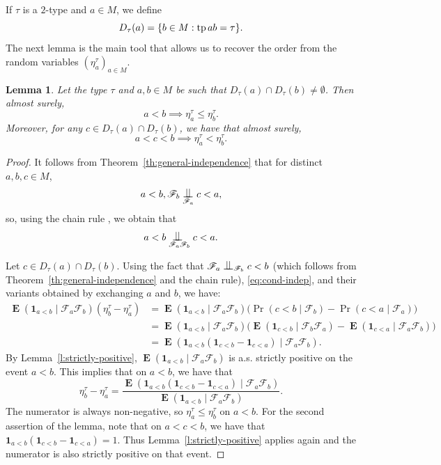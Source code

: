 \documentclass[JEP,XML,SOM,Unicode,published]{cedram}
\let\mathcal\mathscr
\theoremstyle{plain}
\newtheorem{lemma}[theorem]{Lemma}
\theoremstyle{definition}
\newcommand{\bOne}{{\mathbf 1}}
\newcommand{\cF}{\mathcal{F}}
\DeclareMathOperator{\E}{\mathbf{E}}
\DeclareMathOperator{\tp}{tp}
\DeclarePairedDelimiter\set{\{}{\}}
\newcommand{\indep}[1][]{%
  \mathrel{
    \mathop{
      \scalebox{1}[1.3]{\text{$\perp\!\!\!\perp$}}
    }\displaylimits_{#1}
  }
}
\begin{document}
If $\tau$ is a $2$-type and $a \in M$, we define
\begin{equation*}
D_\tau(a) = \set{b \in M : \tp ab = \tau}.
\end{equation*}
The next lemma is the main tool that allows us to recover the order from the random variables $(\eta^\tau_a)_{a \in M}$.
\begin{lemma}
\label{Lem:Inters}
Let the type $\tau$ and $a, b \in M$ be such that $D_\tau(a) \cap D_\tau(b) \neq \emptyset$. Then almost surely,
\begin{equation*}
a<b \implies \eta_a^\tau \leq \eta_b^\tau.
\end{equation*}
Moreover, for any $c \in D_\tau(a) \cap D_\tau(b)$, we have that almost surely,
\begin{equation*}
a < c < b \implies \eta^\tau_a < \eta^\tau_b.
\end{equation*}
\end{lemma}
\begin{proof}
It follows from Theorem~\ref{th:general-independence} that for distinct $a, b, c \in M$,
\begin{equation*}
a < b, \cF_b \indep[\cF_a] c < a,
\end{equation*}
so, using the chain rule \cite[Prop.\,5.8]{Kallenberg2002}, we obtain that
\begin{equation}
\label{eq:cond-indep}
a < b \indep[\cF_a \cF_b] c < a.
\end{equation}

Let $c \in D_\tau(a) \cap D_\tau(b)$. Using the fact that $\cF_a \indep[\cF_b] c < b$ (which follows from Theorem~\ref{th:general-independence} and the chain rule), \eqref{eq:cond-indep}, and their variants obtained by exchanging $a$ and $b$, we have:
\begin{equation*}
\begin{split}
\E(\bOne_{a < b} \mid \cF_a \cF_b) ( \eta^\tau_b - \eta^\tau_a ) &= \E(\bOne_{a < b} \mid \cF_a \cF_b) \big(\Pr(c < b \mid \cF_b) - \Pr(c < a \mid \cF_a) \big) \\
&= \E(\bOne_{a < b} \mid \cF_a \cF_b) \big(\E(\bOne_{c < b} \mid \cF_b \cF_a) - \E(\bOne_{c < a} \mid \cF_a \cF_b) \big) \\
&= \E(\bOne_{a < b}(\bOne_{c < b} - \bOne_{c < a}) \mid \cF_a \cF_b ).
\end{split}
\end{equation*}
By Lemma~\ref{l:strictly-positive}, $\E(\bOne_{a < b} \mid \cF_a \cF_b)$ is a.s. strictly positive on the event $a < b$. This implies that on $a < b$, we have that
\begin{equation*}
\eta^\tau_b - \eta^\tau_a = \frac{\E(\bOne_{a < b}(\bOne_{c < b} - \bOne_{c < a}) \mid \cF_a \cF_b )}{\E(\bOne_{a < b} \mid \cF_a \cF_b)}.
\end{equation*}
The numerator is always non-negative, so $\eta^\tau_a \leq \eta^\tau_b$ on $a < b$. For the second assertion of the lemma, note that on $a < c < b$, we have that $\bOne_{a < b}(\bOne_{c < b} - \bOne_{c < a}) = 1$. Thus Lemma~\ref{l:strictly-positive} applies again and the numerator is also strictly positive on that event.
\end{proof}
\end{document}
